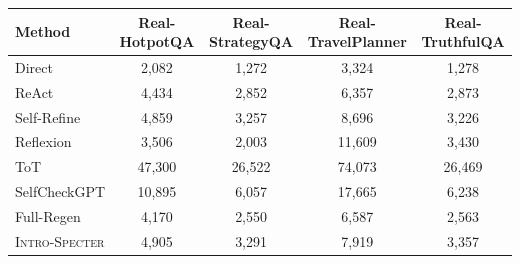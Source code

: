 \begin{tabular}{lcccc}
\toprule
Method & Real-HotpotQA & Real-StrategyQA & Real-TravelPlanner & Real-TruthfulQA \\
\midrule
Direct & 2,082 & 1,272 & 3,324 & 1,278 \\
ReAct & 4,434 & 2,852 & 6,357 & 2,873 \\
Self-Refine & 4,859 & 3,257 & 8,696 & 3,226 \\
Reflexion & 3,506 & 2,003 & 11,609 & 3,430 \\
ToT & 47,300 & 26,522 & 74,073 & 26,469 \\
SelfCheckGPT & 10,895 & 6,057 & 17,665 & 6,238 \\
Full-Regen & 4,170 & 2,550 & 6,587 & 2,563 \\
\textsc{Intro-Specter} & 4,905 & 3,291 & 7,919 & 3,357 \\
\bottomrule
\end{tabular}